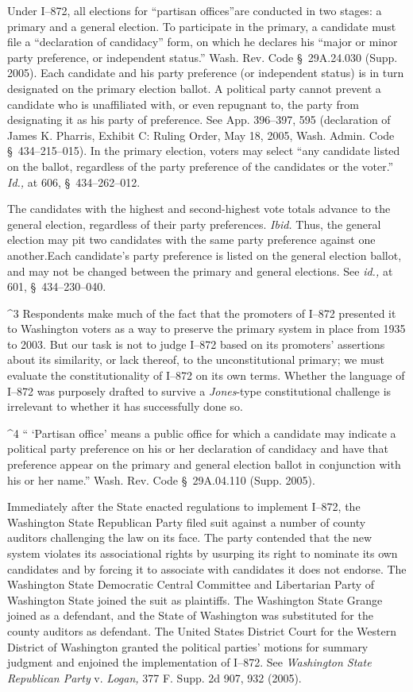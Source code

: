   Under I--872, all elections for ``partisan offices''\footnotemark[4]
are conducted in two stages: a primary and a general election. To
participate in the primary, a candidate must file a ``declaration of
candidacy'' form, on which he declares his ``major or minor party
preference, or independent status.'' Wash. Rev. Code \S~29A.24.030
(Supp. 2005). Each candidate and his party preference (or independent
status) is in turn designated on the primary election ballot. A
political party cannot prevent a candidate who is unaffiliated with,
or even repugnant to, the party from designating it as his party
of preference. See App. 396--397, 595 (declaration of James K.
Pharris, Exhibit C: Ruling Order, May 18, 2005, Wash. Admin. Code
\S~434--215--015). In the primary election, voters may select
``any candidate listed on the ballot, regardless of the party
preference of the candidates or the voter.'' \emph{Id.,} at 606,
\S~434--262--012.

  The candidates with the highest and second-highest vote totals advance
to the general election, regardless of their \newpage  party preferences.
\emph{Ibid.} Thus, the general election may pit two candidates with
the same party preference against one another.\footnotemark[5] Each candidate's
party preference is listed on the general election ballot, and may not
be changed between the primary and general elections. See \emph{id.,} at
601, \S~434--230--040.


^3 Respondents make much of the fact that the promoters of I--872
presented it to Washington voters as a way to preserve the primary
system in place from 1935 to 2003. But our task is not to judge
I--872 based on its promoters' assertions about its similarity, or
lack thereof, to the unconstitutional primary; we must evaluate the
constitutionality of I--872 on its own terms. Whether the language of
I--872 was purposely drafted to survive a \emph{Jones}-type constitutional
challenge is irrelevant to whether it has successfully done so.

^4 `` ‘Partisan office' means a public office for which a candidate
may indicate a political party preference on his or her declaration of
candidacy and have that preference appear on the primary and general
election ballot in conjunction with his or her name.'' Wash. Rev.
Code \S~29A.04.110 (Supp. 2005).

  Immediately after the State enacted regulations to implement I--872,
the Washington State Republican Party filed suit against a number of
county auditors challenging the law on its face. The party contended
that the new system violates its associational rights by usurping its
right to nominate its own candidates and by forcing it to associate
with candidates it does not endorse. The Washington State Democratic
Central Committee and Libertarian Party of Washington State joined the
suit as plaintiffs. The Washington State Grange joined as a defendant,
and the State of Washington was substituted for the county auditors as
defendant. The United States District Court for the Western District of
Washington granted the political parties' motions for summary judgment
and enjoined the implementation of I--872. See \emph{Washington State
Republican Party} v. \emph{Logan,} 377 F. Supp. 2d 907, 932 (2005).

